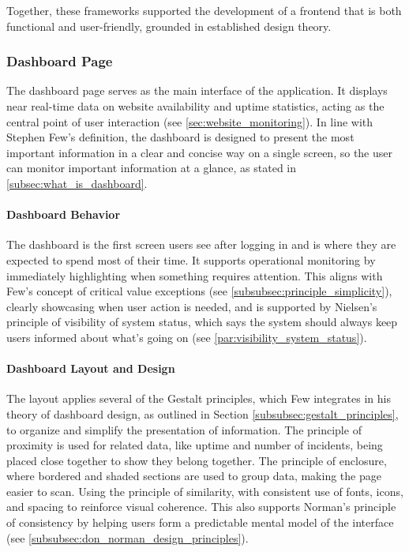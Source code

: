 Together, these frameworks supported the development of a frontend that is both functional and user-friendly, grounded in established design theory.



\subsubsection{Dashboard Page}
The dashboard page serves as the main interface of the application. It displays near real-time data on website availability and uptime statistics, acting as the central point of user interaction (see \ref{sec:website_monitoring}). In line with Stephen Few's definition, the dashboard is designed to present the most important information in a clear and concise way on a single screen, so the user can monitor important information at a glance, as stated in \ref{subsec:what_is_dashboard}. 

\paragraph{Dashboard Behavior}

The dashboard is the first screen users see after logging in and is where they are expected to spend most of their time. It supports operational monitoring by immediately highlighting when something requires attention. This aligns with Few's concept of critical value exceptions (see \ref{subsubsec:principle_simplicity}), clearly showcasing when user action is needed, and is supported by Nielsen's principle of visibility of system status, which says the system should always keep users informed about what's going on (see \ref{par:visibility_system_status}). 

\paragraph{Dashboard Layout and Design}
The layout applies several of the Gestalt principles, which Few integrates in his theory of dashboard design, as outlined in Section \ref{subsubsec:gestalt_principles}, to organize and simplify the presentation of information. The principle of proximity is used for related data, like uptime and number of incidents, being placed close together to show they belong together. The principle of enclosure, where bordered and shaded sections are used to group data, making the page easier to scan. Using the principle of similarity, with consistent use of fonts, icons, and spacing to reinforce visual coherence. This also supports Norman's principle of consistency by helping users form a predictable mental model of the interface (see \ref{subsubsec:don_norman_design_principles}).

